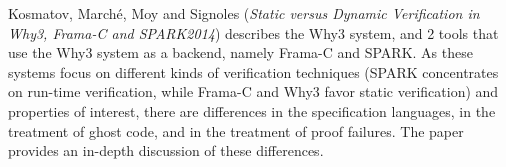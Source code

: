 

Kosmatov, March\'{e}, Moy and Signoles
\cite{isola-2016-kosmatov}
({\em Static versus Dynamic Verification in 
      Why3, Frama-C and SPARK2014})
describes the Why3 system, and 2 tools that use the Why3 system as a
backend, namely Frama-C and SPARK. As these systems focus on different
kinds of verification techniques (SPARK concentrates on run-time
verification, while Frama-C and Why3 favor static verification) and
properties of interest, there are differences in the specification
languages, in the treatment of ghost code, and in the treatment of
proof failures. The paper provides an in-depth discussion of these differences.
